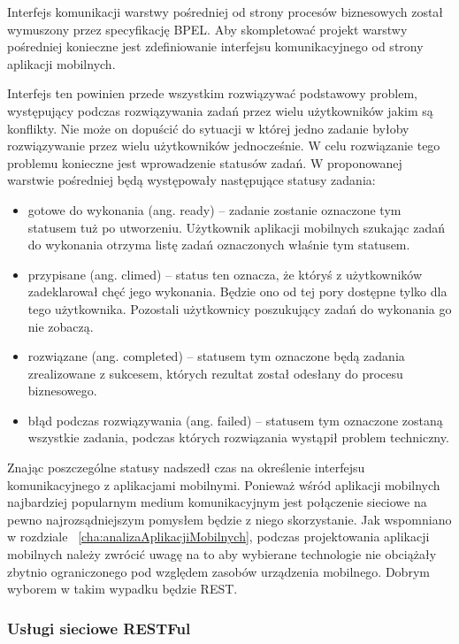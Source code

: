 Interfejs komunikacji warstwy pośredniej od strony procesów biznesowych został wymuszony przez specyfikację BPEL. Aby skompletować projekt warstwy pośredniej konieczne jest zdefiniowanie interfejsu komunikacyjnego od strony aplikacji mobilnych. 

Interfejs ten powinien przede wszystkim rozwiązywać podstawowy problem, występujący podczas rozwiązywania zadań przez wielu użytkowników jakim są konflikty. Nie może on dopuścić do sytuacji w której jedno zadanie byłoby rozwiązywanie przez wielu użytkowników jednocześnie. W celu rozwiązanie tego problemu konieczne jest wprowadzenie statusów zadań. W proponowanej warstwie pośredniej będą występowały następujące statusy zadania:

\begin{itemize}
\item gotowe do wykonania (ang. ready) -- zadanie zostanie oznaczone tym statusem tuż po utworzeniu. Użytkownik aplikacji mobilnych szukając zadań do wykonania otrzyma listę zadań oznaczonych właśnie tym statusem. 
\item przypisane (ang. climed) -- status ten oznacza, że któryś z użytkowników zadeklarował chęć jego wykonania. Będzie ono od tej pory dostępne tylko dla tego użytkownika. Pozostali użytkownicy poszukujący zadań do wykonania go nie zobaczą. 
\item rozwiązane (ang. completed) -- statusem tym oznaczone będą zadania zrealizowane z sukcesem, których rezultat został odesłany do procesu biznesowego. 
\item błąd podczas rozwiązywania (ang. failed) -- statusem tym oznaczone zostaną wszystkie zadania, podczas których rozwiązania wystąpił problem techniczny. 
\end{itemize}

Znając poszczególne statusy nadszedł czas na określenie interfejsu komunikacyjnego z aplikacjami mobilnymi. Ponieważ wśród aplikacji mobilnych najbardziej popularnym medium komunikacyjnym jest połączenie sieciowe na pewno najrozsądniejszym pomysłem będzie z niego skorzystanie. Jak wspomniano w rozdziale ~\ref{cha:analizaAplikacjiMobilnych}, podczas projektowania aplikacji mobilnych należy zwrócić uwagę na to aby wybierane technologie nie obciążały zbytnio ograniczonego pod względem zasobów urządzenia mobilnego. Dobrym wyborem w takim wypadku będzie REST. 

\subsubsection{Usługi sieciowe RESTFul}

